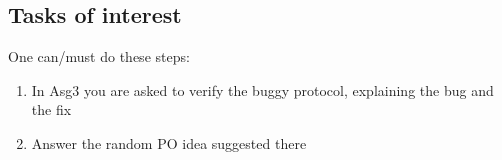 \documentclass[11pt]{article}
\begin{document}
\subsection{Tasks of interest}

\noindent One can/must do these steps:
\begin{enumerate}
\item In Asg3 you are asked to verify the
  buggy protocol, explaining the bug and the fix
\item Answer the random PO idea suggested there
\end{enumerate}
\end{document}
